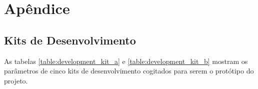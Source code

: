 \chapter{Apêndice}\label{chapter:apendice}

\section{Kits de Desenvolvimento}\label{section:kits_de_desenvolvimento}

As tabelas \autoref{table:development_kit_a} e \autoref{table:development_kit_b} mostram os parâmetros de cinco kits de desenvolvimento cogitados para serem o protótipo do projeto.


